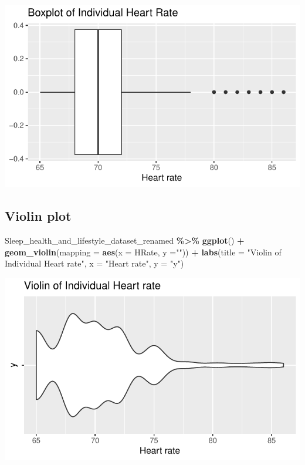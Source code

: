\documentclass[
  11pt,
]{article}
\newenvironment{Shaded}{\begin{snugshade}}{\end{snugshade}}
\newcommand{\AttributeTok}[1]{\textcolor[rgb]{0.13,0.29,0.53}{#1}}
\newcommand{\FunctionTok}[1]{\textcolor[rgb]{0.13,0.29,0.53}{\textbf{#1}}}
\newcommand{\NormalTok}[1]{#1}
\newcommand{\SpecialCharTok}[1]{\textcolor[rgb]{0.81,0.36,0.00}{\textbf{#1}}}
\newcommand{\StringTok}[1]{\textcolor[rgb]{0.31,0.60,0.02}{#1}}
\begin{document}
\begin{center}\includegraphics[width=0.7\linewidth]{SleepHelath_files/figure-latex/unnamed-chunk-18-1} \end{center}

\hypertarget{violin-plot}{%
\subsection{Violin plot}\label{violin-plot}}

\begin{Shaded}
\begin{Highlighting}[]
\NormalTok{Sleep\_health\_and\_lifestyle\_dataset\_renamed }\SpecialCharTok{\%\textgreater{}\%}
  \FunctionTok{ggplot}\NormalTok{() }\SpecialCharTok{+}
    \FunctionTok{geom\_violin}\NormalTok{(}\AttributeTok{mapping =} \FunctionTok{aes}\NormalTok{(}\AttributeTok{x =}\NormalTok{ HRate, }\AttributeTok{y =}\StringTok{""}\NormalTok{)) }\SpecialCharTok{+}
    \FunctionTok{labs}\NormalTok{(}\AttributeTok{title =} \StringTok{"Violin of Individual Heart rate"}\NormalTok{, }\AttributeTok{x =} \StringTok{"Heart rate"}\NormalTok{, }\AttributeTok{y =} \StringTok{"y"}\NormalTok{)}
\end{Highlighting}
\end{Shaded}

\begin{center}\includegraphics[width=0.7\linewidth]{SleepHelath_files/figure-latex/unnamed-chunk-19-1} \end{center}
\end{document}
